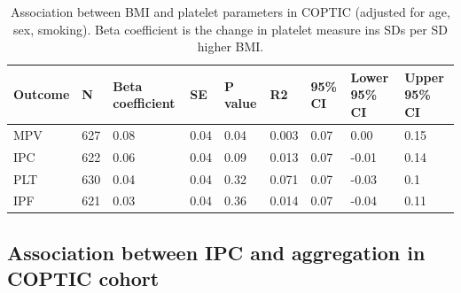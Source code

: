 \documentclass[11pt,twoside]{bristolthesis}
\begin{document}
\begin{landscape}\begin{table}

\caption[Association between BMI and platelet parameters in COPTIC (adjusted for age, sex, smoking)]{\label{tab:BMI-platelets-COPTIC}Association between BMI and platelet parameters in COPTIC (adjusted for age, sex, smoking). Βeta coefficient is the change in platelet measure ins SDs per SD higher BMI.}
\centering
\begin{tabu} to 
\toprule
Outcome & N & Βeta coefficient & SE & P value & R2 & 95\% CI & Lower 95\% CI & Upper 95\% CI\\
\midrule
MPV & 627 & 0.08 & 0.04 & 0.04 & 0.003 & 0.07 & 0.00 & 0.15\\
IPC & 622 & 0.06 & 0.04 & 0.09 & 0.013 & 0.07 & -0.01 & 0.14\\
PLT & 630 & 0.04 & 0.04 & 0.32 & 0.071 & 0.07 & -0.03 & 0.1\\
IPF & 621 & 0.03 & 0.04 & 0.36 & 0.014 & 0.07 & -0.04 & 0.11\\
\bottomrule
\end{tabu}
\end{table}
\end{landscape}
\hypertarget{association-between-ipc-and-aggregation-in-coptic-cohort}{%
\subsection{Association between IPC and aggregation in COPTIC cohort}\label{association-between-ipc-and-aggregation-in-coptic-cohort}}
\end{document}
